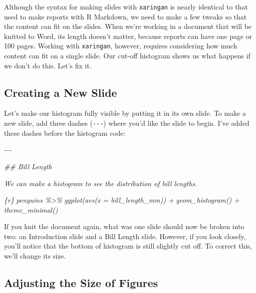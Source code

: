 \documentclass[
]{book}
\newenvironment{Shaded}{\begin{snugshade}}{\end{snugshade}}
\newcommand{\CommentTok}[1]{\textcolor[rgb]{0.56,0.35,0.01}{\textit{#1}}}
\begin{document}
Although the syntax for making slides with \texttt{xaringan} is nearly identical to that used to make reports with R Markdown, we need to make a few tweaks so that the content can fit on the slides. When we're working in a document that will be knitted to Word, its length doesn't matter, because reports can have one page or 100 pages. Working with \texttt{xaringan}, however, requires considering how much content can fit on a single slide. Our cut-off histogram shows us what happens if we don't do this. Let's fix it.

\hypertarget{creating-a-new-slide}{%
\subsection*{Creating a New Slide}\label{creating-a-new-slide}}

Let's make our histogram fully visible by putting it in its own slide. To make a new slide, add three dashes (\texttt{-\/-\/-}) where you'd like the slide to begin. I've added these dashes before the histogram code:

\begin{Shaded}
\begin{Highlighting}[]
\CommentTok{{-}{-}{-}}

\CommentTok{\#\# Bill Length}

\CommentTok{We can make a histogram to see the distribution of bill lengths.}

\CommentTok{\textasciigrave{}\textasciigrave{}\textasciigrave{}\{r\}}
\CommentTok{penguins \%\textgreater{}\% }
\CommentTok{  ggplot(aes(x = bill\_length\_mm)) +}
\CommentTok{  geom\_histogram() +}
\CommentTok{  theme\_minimal()}
\CommentTok{\textasciigrave{}\textasciigrave{}\textasciigrave{}}
\end{Highlighting}
\end{Shaded}

If you knit the document again, what was one slide should now be broken into two: an Introduction slide and a Bill Length slide. However, if you look closely, you'll notice that the bottom of histogram is still slightly cut off. To correct this, we'll change its size.

\hypertarget{adjusting-the-size-of-figures}{%
\subsection*{Adjusting the Size of Figures}\label{adjusting-the-size-of-figures}}
\end{document}
